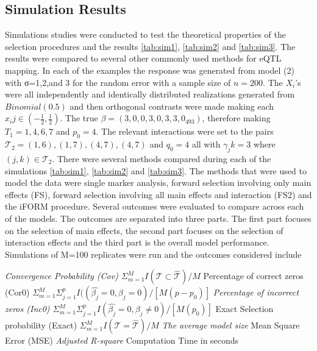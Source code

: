 \documentclass[11pt,]{book}
\theoremstyle{definition}
\theoremstyle{definition}
\theoremstyle{remark}
\begin{document}
\subsection{Simulation Results}\label{simulation-results}

Simulations studies were conducted to test the theoretical properties of
the selection procedures and the results \ref{tab:sim1}, \ref{tab:sim2}
and \ref{tab:sim3}. The results were compared to several other commonly
used methods for eQTL mapping. In each of the examples the response was
generated from model (2) with σ=1,2,and 3 for the random error with a
sample size of \(n=200\). The \(X_i\)'s were all independently and
identically distributed realizations generated from \(Binomial(0.5)\)
and then orthogonal contrasts were made making each
\(x_ij\in (-\frac{1}{2}, \frac{1}{2})\). The true
\(\beta=(3,0,0,3,0,3,3,0_{493})\), therefore making \(T_1={1,4,6,7}\)
and \(p_0=4\). The relevant interactions were set to the pairs
\(\mathcal{T}_2={(1,6),(1,7),(4,7),(4,7)}\) and \(q_0=4\) all with
\(γ_jk=3\) where \((j,k) \in \mathcal{T}_2\). There were several methods
compared during each of the simulations \ref{tab:sim1}, \ref{tab:sim2}
and \ref{tab:sim3}. The methods that were used to model the data were
single marker analysis, forward selection involving only main effects
(FS), forward selection involving all main effects and interaction (FS2)
and the iFORM procedure. Several outcomes were evaluated to compare
across each of the models. The outcomes are separated into three parts.
The first part focuses on the selection of main effects, the second part
focuses on the selection of interaction effects and the third part is
the overall model performance. Simulations of M=100 replicates were run
and the outcomes considered include

\emph{Convergence Probability (Cov)
\(\Sigma_{m=1}^MI(\mathcal{T} \subset \hat{\mathcal{T}})/M\) }Percentage
of correct zeros (Cor0)
\(\Sigma_{m=1}^M\Sigma_{j=1}^pI((\hat{\beta_j}=0,\beta_j=0)/[M(p-p_0)]\)
\emph{Percentage of incorrect zeros (Inc0)
\(\Sigma_{m=1}^M\Sigma_{j=1}^p I(\hat{\beta_j}=0,\beta_j \ne 0)/[M(p_0)]\)
}Exact Selection probability (Exact)
\(\Sigma_{m=1}^M I(\mathcal{T}=\hat{\mathcal{T}})/M\) \emph{The average
model size }Mean Square Error (MSE) \emph{Adjusted R-square }Computation
Time in seconds
\end{document}
